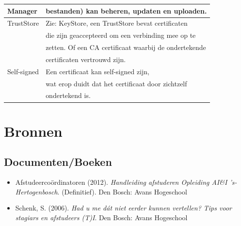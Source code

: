 \documentclass[]{article}
\begin{document}
\begin{tabular}{|| l | l ||}
    Manager          & bestanden) kan beheren, updaten en uploaden.         \\\hline
    TrustStore       & Zie: KeyStore, een TrustStore bevat certificaten     \\
                     & die zijn geaccepteerd om een verbinding mee op te    \\
                     & zetten. Of een CA certificaat waarbij de ondertekende\\
                     & certificaten vertrouwd  zijn.                        \\\hline
    Self-signed      & Een certificaat kan self-signed zijn,                \\
                     & wat erop duidt dat het certificaat door zichtzelf    \\
                     & ondertekend is.                                      \\\hline
\end{tabular}

\newpage
\section{Bronnen}


\subsection{Documenten/Boeken}
\begin{itemize}
    \item Afstudeerco\"ordinatoren (2012). \textit{Handleiding afstuderen Opleiding AI\&I
's-Hertogenbosch}. (Definitief). Den Bosch: Avans Hogeschool
    \item Schenk, S. (2006). \textit{Had u me d\'at niet eerder kunnen
vertellen? Tips voor stagiars en afstudeers (T)I}. Den Bosch: Avans Hogeschool 
\end{itemize}
\end{document}
